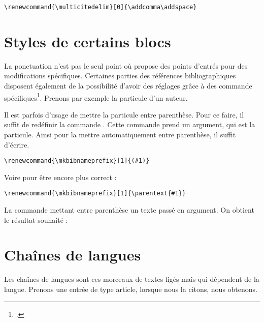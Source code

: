 \begin{verbatim}
\renewcommand{\multicitedelim}[0]{\addcomma\addspace}
\end{verbatim}

\section{Styles de certains blocs}

La ponctuation n'est pas le seul point où  propose des points d'entrés pour des modifications spécifiques. Certaines parties des références bibliographiques disposent également de la possibilité d'avoir des réglages grâce à des commande spécifiques\footcite{biblatex_hooks}. Prenons par exemple la particule d'un auteur.
	
	\begin{quotation}
	\cite{BeauvoirSexe}
	\end{quotation}
	
	\renewcommand{\mkbibnameprefix}[1]{\parentext{#1}}
	
Il est parfois d'usage de mettre la particule entre parenthèse. Pour ce faire, il suffit de redéfinir la commande . Cette commande prend un argument, qui est la particule. Ainsi pour la mettre automatiquement entre parenthèse, il suffit d'écrire.
	
	\begin{verbatim}
\renewcommand{\mkbibnameprefix}[1]{(#1)}
	\end{verbatim}
	
Voire pour être encore plus correct :
	
	\begin{verbatim}
\renewcommand{\mkbibnameprefix}[1]{\parentext{#1}}
	\end{verbatim}

La commande  mettant entre parenthèse un texte passé en argument. On obtient le résultat souhaité : 

	\begin{quotation}
	\cite{BeauvoirSexe}
	\end{quotation}

\section{Chaînes de langues}
	
	Les chaînes de langues sont ces morceaux de textes figés mais qui dépendent de la langue. Prenons une entrée de type article, lorsque nous la citons, nous obtenons.
	
